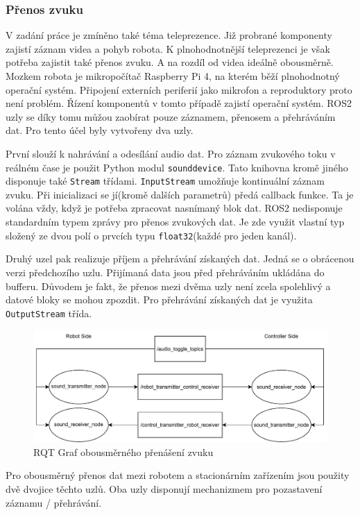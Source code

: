 \subsubsection*{Přenos zvuku}
V zadání práce je zmíněno také téma teleprezence. Již probrané komponenty zajistí záznam videa a pohyb robota. K plnohodnotnější teleprezenci je však potřeba zajistit také přenos zvuku. A na rozdíl od videa ideálně obousměrně. Mozkem robota je mikropočítač Raspberry Pi 4, na kterém běží plnohodnotný operační systém. Připojení externích periferií jako mikrofon a reproduktory proto není problém. Řízení komponentů v tomto případě zajistí operační systém. ROS2 uzly se díky tomu můžou zaobírat pouze záznamem, přenosem a přehráváním dat. Pro tento účel byly vytvořeny dva uzly.

První slouží k nahrávání a odesílání audio dat. Pro záznam zvukového toku v reálném čase je použit Python modul \verb|sounddevice|. Tato knihovna kromě jiného disponuje také \verb|Stream| třídami. \verb|InputStream| umožňuje kontinuální záznam zvuku. Při inicializaci se jí(kromě dalších parametrů) předá callback funkce. Ta je volána vždy, když je potřeba zpracovat nasnímaný blok dat. ROS2 nedisponuje standardním typem zprávy pro přenos zvukových dat. Je zde využit vlastní typ složený ze dvou polí o prvcích typu \verb|float32|(každé pro jeden kanál).

Druhý uzel pak realizuje příjem a přehrávání získaných dat. Jedná se o obrácenou verzi předchozího uzlu. Přijímaná data jsou před přehráváním ukládána do bufferu. Důvodem je fakt, že přenos mezi dvěma uzly není zcela spolehlivý a datové bloky se mohou zpozdit. Pro přehrávání získaných dat je využita \verb|OutputStream| třída.

\begin{figure}[h!]
	\centering
	\includegraphics[scale=0.75]{obrazky-figures/audio_transfer_diagram.pdf}
	\caption{RQT Graf obousměrného přenášení zvuku}
	\label{}
\end{figure}

Pro obousměrný přenos dat mezi robotem a stacionárním zařízením jsou použity dvě dvojice těchto uzlů. Oba uzly disponují mechanizmem pro pozastavení záznamu / přehrávání. 

